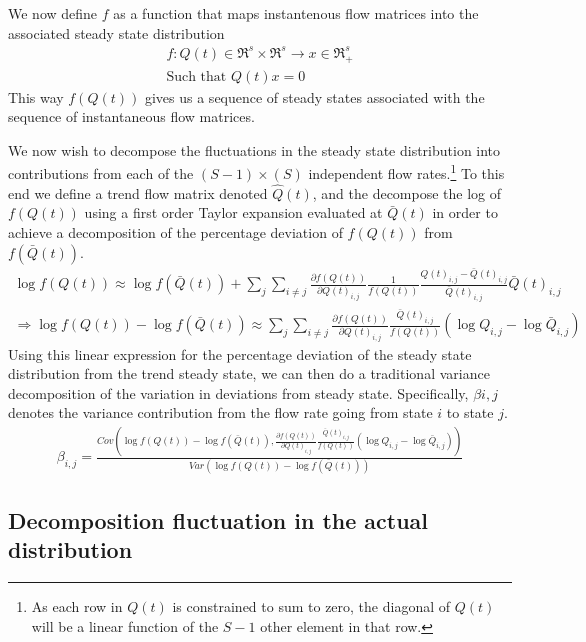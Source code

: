 We now define $f$ as a function that maps instantenous flow matrices into the associated steady state distribution
\begin{align}
f: Q(t) \in \Re^s \times \Re^s \rightarrow x \in \Re^s_+  \\
\text{Such that } Q(t)x=0 \nonumber
\end{align}
This way $f(Q(t))$ gives us a sequence of steady states associated with the sequence of instantaneous flow matrices. 

We now wish to decompose the fluctuations in the steady state distribution into contributions from each of the $(S-1) \times (S)$ independent flow rates.\footnote{As each row in $Q(t)$ is constrained to sum to zero, the diagonal of $Q(t)$ will be a linear function of the $S-1$ other element in that row.} To this end we define a trend flow matrix denoted $\hat{Q}(t)$, and the decompose the log of $f(Q(t))$ using a first order Taylor expansion evaluated at $\bar{Q}(t)$ in order to achieve a decomposition of the percentage deviation of $f(Q(t))$ from $f(\bar{Q}(t))$.
\begin{align}
\log f(Q(t)) \approx \log f(\bar{Q}(t))+\sum_{j}\sum_{i \neq j} \frac{\partial f(Q(t))}{\partial Q(t)_{i,j}} \frac{1}{f(Q(t))} \frac{Q(t)_{i,j}-\bar{Q}(t)_{i,j}}{\bar{Q}(t)_{i,j}} \bar{Q}(t)_{i,j} \nonumber \\
\Rightarrow \log f(Q(t)) -\log f(\bar{Q}(t)) \approx \sum_{j} \sum_{i \neq j} \frac{\partial f(Q(t))}{\partial Q(t)_{i,j}} \frac{\bar{Q}(t)_{i,j}}{f(Q(t))} \left( \log Q_{i,j}-\log \bar{Q}_{i,j} \right)
\end{align}
Using this linear expression for the percentage deviation of the steady state distribution from the trend steady state, we can then do a traditional variance decomposition of the variation in deviations from steady state. Specifically, $\beta{i,j}$ denotes the variance contribution from the flow rate going from state $i$ to state $j$.
\begin{align}
\beta_{i,j}=\frac{Cov \left( \log f(Q(t)) -\log f(\bar{Q}(t)), \frac{\partial f(Q(t))}{\partial Q(t)_{i,j}} \frac{\bar{Q}(t)_{i,j}}{f(Q(t))} \left( \log Q_{i,j}-\log \bar{Q}_{i,j}  \right) \right)}{Var \left( \log f(Q(t)) -\log f(\bar{Q}(t)) \right)}
\end{align}

\subsection{Decomposition fluctuation in the actual distribution}

